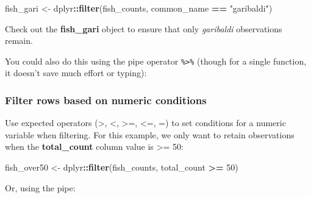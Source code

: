 \documentclass[]{book}
\newenvironment{Shaded}{\begin{snugshade}}{\end{snugshade}}
\newcommand{\DecValTok}[1]{\textcolor[rgb]{0.00,0.00,0.81}{#1}}
\newcommand{\KeywordTok}[1]{\textcolor[rgb]{0.13,0.29,0.53}{\textbf{#1}}}
\newcommand{\NormalTok}[1]{#1}
\newcommand{\OperatorTok}[1]{\textcolor[rgb]{0.81,0.36,0.00}{\textbf{#1}}}
\newcommand{\StringTok}[1]{\textcolor[rgb]{0.31,0.60,0.02}{#1}}
\begin{document}
\begin{Shaded}
\begin{Highlighting}[]
\NormalTok{fish_gari <-}\StringTok{ }\NormalTok{dplyr}\OperatorTok{::}\KeywordTok{filter}\NormalTok{(fish_counts, common_name }\OperatorTok{==}\StringTok{ "garibaldi"}\NormalTok{)}
\end{Highlighting}
\end{Shaded}

Check out the \textbf{fish\_gari} object to ensure that only \emph{garibaldi} observations remain.

You could also do this using the pipe operator \texttt{\%\textgreater{}\%} (though for a single function, it doesn't save much effort or typing):

\begin{Shaded}
\end{Shaded}

\hypertarget{filter-rows-based-on-numeric-conditions}{%
\subsubsection{Filter rows based on numeric conditions}\label{filter-rows-based-on-numeric-conditions}}

Use expected operators (\textgreater{}, \textless{}, \textgreater{}=, \textless{}=, =) to set conditions for a numeric variable when filtering. For this example, we only want to retain observations when the \textbf{total\_count} column value is \textgreater{}= 50:

\begin{Shaded}
\begin{Highlighting}[]
\NormalTok{fish_over50 <-}\StringTok{ }\NormalTok{dplyr}\OperatorTok{::}\KeywordTok{filter}\NormalTok{(fish_counts, total_count }\OperatorTok{>=}\StringTok{ }\DecValTok{50}\NormalTok{)}
\end{Highlighting}
\end{Shaded}

Or, using the pipe:

\begin{Shaded}
\end{Shaded}
\end{document}
